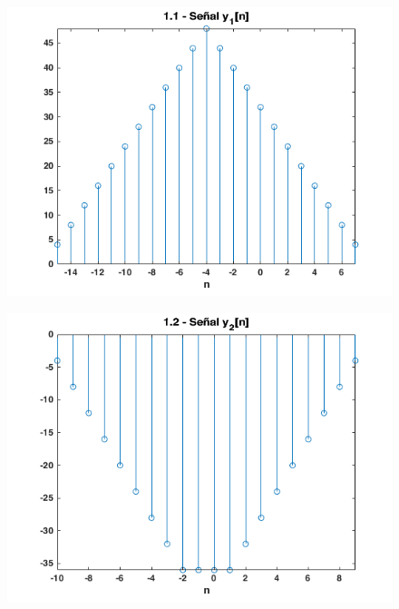 \documentclass{article}
\begin{document}
\begin{figure} \caption[Figura 4]{}
	\centering
	\includegraphics[width=\linewidth]{./Figures/04.png}
\end{figure}

\begin{figure} \caption[Figura 5]{}
	\centering
	\includegraphics[width=\linewidth]{./Figures/05.png}
\end{figure}
\end{document}
